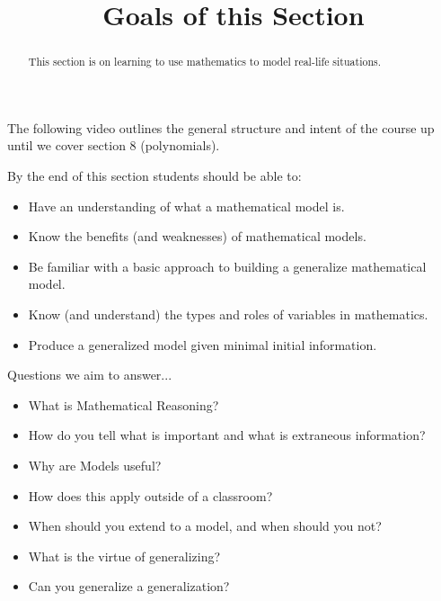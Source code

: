 \documentclass{ximera}
\title{Goals of this Section}
\begin{document}
\begin{abstract}
    This section is on learning to use mathematics to model real-life situations.
\end{abstract}
\maketitle
The following video outlines the general structure and intent of the course up until we cover section 8 (polynomials).


By the end of this section students should be able to:

\begin{itemize}
    \item Have an understanding of what a mathematical model is.
    \item Know the benefits (and weaknesses) of mathematical models.
    \item Be familiar with a basic approach to building a generalize mathematical model.
    \item Know (and understand) the types and roles of variables in mathematics.
    \item Produce a generalized model given minimal initial information.
\end{itemize}

Questions we aim to answer...

\begin{itemize}
    \item What is Mathematical Reasoning?
    \item How do you tell what is important and what is extraneous information?
    \item Why are Models useful?
    \item How does this apply outside of a classroom?
    \item When should you extend to a model, and when should you not?
    \item What is the virtue of generalizing?
    \item Can you generalize a generalization?
\end{itemize}
\end{document}

